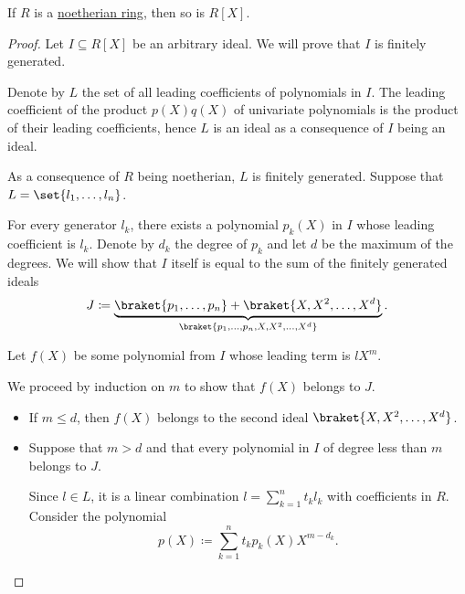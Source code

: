 \begin{theorem}\label{thm:hilberts_basis_theorem}
  If \( R \) is a \hyperref[def:noetherian_semiring]{noetherian ring}, then so is \( R[X] \).
\end{theorem}
\begin{proof}
  Let \( I \subseteq R[X] \) be an arbitrary ideal. We will prove that \( I \) is finitely generated.

  Denote by \( L \) the set of all leading coefficients of polynomials in \( I \). The leading coefficient of the product \( p(X) q(X) \) of univariate polynomials is the product of their leading coefficients, hence \( L \) is an ideal as a consequence of \( I \) being an ideal.

  As a consequence of \( R \) being noetherian, \( L \) is finitely generated. Suppose that \( L = \set{ l_1, \ldots, l_n } \).

  For every generator \( l_k \), there exists a polynomial \( p_k(X) \) in \( I \) whose leading coefficient is \( l_k \). Denote by \( d_k \) the degree of \( p_k \) and let \( d \) be the maximum of the degrees. We will show that \( I \) itself is equal to the sum of the finitely generated ideals
  \begin{equation*}
    J \coloneqq \underbrace{ \braket{ p_1, \ldots, p_n } + \braket{ X, X^2, \ldots, X^d } }_{ \braket{ p_1, \ldots, p_n, X, X^2, \ldots, X^d } }.
  \end{equation*}

  Let \( f(X) \) be some polynomial from \( I \) whose leading term is \( l X^m \).

  We proceed by induction on \( m \) to show that \( f(X) \) belongs to \( J \).
  \begin{itemize}
    \item If \( m \leq d \), then \( f(X) \) belongs to the second ideal \( \braket{ X, X^2, \ldots, X^d } \).

    \item Suppose that \( m > d \) and that every polynomial in \( I \) of degree less than \( m \) belongs to \( J \).

    Since \( l \in L \), it is a linear combination \( l = \sum_{k=1}^n t_k l_k \) with coefficients in \( R \). Consider the polynomial
    \begin{equation*}
      p(X) \coloneqq \sum_{k=1}^n t_k p_k(X) X^{m - d_k}.
    \end{equation*}


\end{itemize}
\end{proof}
